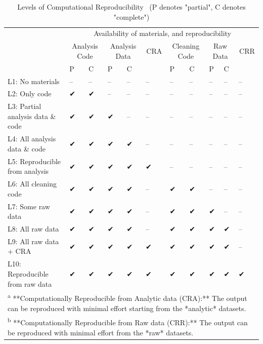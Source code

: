 \documentclass[
]{book}
\begin{document}
\begin{table}

\caption{\label{tab:levels-of-computational-reproducibility}Levels of Computational Reproducibility \
 (P denotes "partial", C denotes "complete")}
\centering
\begin{tabular}[t]{l|l|l|l|l|l|l|l|l|l|l}
\hline
\multicolumn{1}{c|}{ } & \multicolumn{10}{c}{Availability of materials, and reproducibility} \\
\cline{2-11}
\multicolumn{1}{c|}{ } & \multicolumn{2}{c|}{Analysis Code} & \multicolumn{2}{c|}{Analysis Data} & \multicolumn{1}{c|}{CRA} & \multicolumn{2}{c|}{Cleaning Code} & \multicolumn{2}{c|}{Raw Data} & \multicolumn{1}{c}{CRR} \\
\cline{2-3} \cline{4-5} \cline{6-6} \cline{7-8} \cline{9-10} \cline{11-11}
  & P & C & P & C &   & P & C & P & C &  \\
\hline
L1: No materials & -- & -- & -- & -- & -- & -- & -- & -- & -- & --\\
\hline
L2: Only code & ✔ & ✔ & -- & -- & -- & -- & -- & -- & -- & --\\
\hline
L3: Partial analysis data \& code & ✔ & ✔ & ✔ & -- & -- & -- & -- & -- & -- & --\\
\hline
L4: All analysis data \& code & ✔ & ✔ & ✔ & ✔ & -- & -- & -- & -- & -- & --\\
\hline
L5: Reproducible from analysis & ✔ & ✔ & ✔ & ✔ & ✔ & -- & -- & -- & -- & --\\
\hline
L6: All cleaning code & ✔ & ✔ & ✔ & ✔ & -- & ✔ & ✔ & -- & -- & --\\
\hline
L7: Some raw data & ✔ & ✔ & ✔ & ✔ & -- & ✔ & ✔ & ✔ & -- & --\\
\hline
L8: All raw data & ✔ & ✔ & ✔ & ✔ & -- & ✔ & ✔ & ✔ & ✔ & --\\
\hline
L9: All raw data + CRA & ✔ & ✔ & ✔ & ✔ & ✔ & ✔ & ✔ & ✔ & ✔ & --\\
\hline
L10: Reproducible from raw data & ✔ & ✔ & ✔ & ✔ & ✔ & ✔ & ✔ & ✔ & ✔ & ✔\\
\hline
\multicolumn{11}{l}{\rule{0pt}{1em}\textsuperscript{a} **Computationally Reproducible from Analytic data (CRA):** The output can be reproduced with minimal effort starting from the *analytic* datasets.}\\
\multicolumn{11}{l}{\rule{0pt}{1em}\textsuperscript{b} **Computationally Reproducible from Raw data (CRR):** The output can be reproduced with minimal effort from the *raw* datasets.}\\
\end{tabular}
\end{table}
\end{document}
